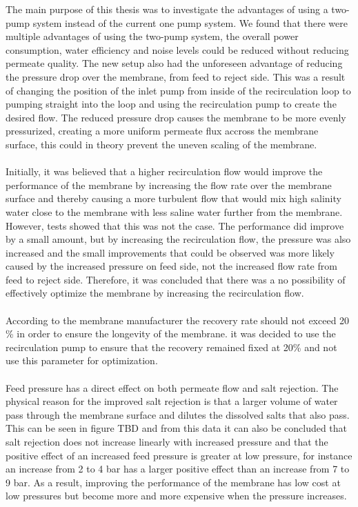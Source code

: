 The main purpose of this thesis was to investigate the advantages of using a two-pump system instead of the current one pump system. We found that there were multiple advantages of using the two-pump system, the overall power consumption, water efficiency and noise levels could be reduced without reducing permeate quality. The new setup also had the unforeseen advantage of reducing the pressure drop over the membrane, from feed to reject side. This was a result of changing the position of the inlet pump from inside of the recirculation loop to pumping straight into the loop and using the recirculation pump to create the desired flow. The reduced pressure drop causes the membrane to be more evenly pressurized, creating a more uniform permeate flux accross the membrane surface, this could in theory prevent the uneven scaling of the membrane.\\
\\
Initially, it was believed that a higher recirculation flow would improve the performance of the membrane by increasing the flow rate over the membrane surface and thereby causing a more turbulent flow that would mix high salinity water close to the membrane with less saline water further from the membrane. However, tests showed that this was not the case. The performance did improve by a small amount, but by increasing the recirculation flow, the pressure was also increased and the small improvements that could be observed was more likely caused by the increased pressure on feed side, not the increased flow rate from feed to reject side. Therefore, it was concluded that there was a no possibility of effectively optimize the membrane by increasing the recirculation flow. \\
\\
According to the membrane manufacturer the recovery rate should not exceed 20 \% in order to ensure the longevity of the membrane. it was decided to use the recirculation pump to ensure that the recovery remained fixed at 20\% and not use this parameter for optimization.\\
\\
Feed pressure has a direct effect on both permeate flow and salt rejection. The physical reason for the improved salt rejection is that a larger volume of water pass through the membrane surface and dilutes the dissolved salts that also pass. This can be seen in figure TBD and from this data it can also be concluded that salt rejection does not increase linearly with increased pressure and that the positive effect of an increased feed pressure is greater at low pressure, for instance an increase from 2 to 4 bar has a larger positive effect than an increase from 7 to 9 bar. As a result, improving the performance of the membrane has low cost at low pressures but become more and more expensive when the pressure increases.\\
